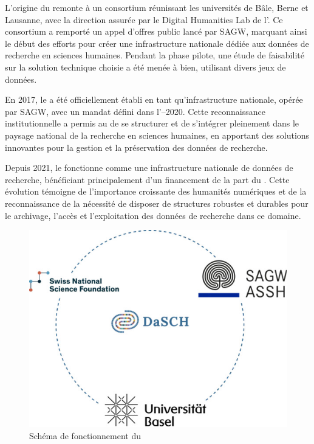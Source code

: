         L'origine du \dsc remonte à un consortium réunissant les universités de Bâle, Berne et Lausanne, avec la direction assurée par le Digital Humanities Lab de l'\unibas. Ce consortium a remporté un appel d'offres public lancé par SAGW, marquant ainsi le début des efforts pour créer une infrastructure nationale dédiée aux données de recherche en sciences humaines. Pendant la phase pilote, une étude de faisabilité sur la solution technique choisie a été menée à bien, utilisant divers jeux de données.
    
        En 2017, le \dsc a été officiellement établi en tant qu'infrastructure nationale, opérée par SAGW, avec un mandat défini dans l'–2020. Cette reconnaissance institutionnelle a permis au \dsc de se structurer et de s'intégrer pleinement dans le paysage national de la recherche en sciences humaines, en apportant des solutions innovantes pour la gestion et la préservation des données de recherche.
        
        Depuis 2021, le \dsc fonctionne comme une infrastructure nationale de données de recherche, bénéficiant principalement d'un financement de la part du \SNSFn. Cette évolution témoigne de l'importance croissante des humanités numériques et de la reconnaissance de la nécessité de disposer de structures robustes et durables pour le archivage, l'accès et l'exploitation des données de recherche dans ce domaine.

        
        \begin{figure}[h!]
            \centering
            \includegraphics[width=12cm]{02_images/part_01/01_funding.jpg}
            \caption{Schéma de fonctionnement du \dsc}
        \end{figure}
    
